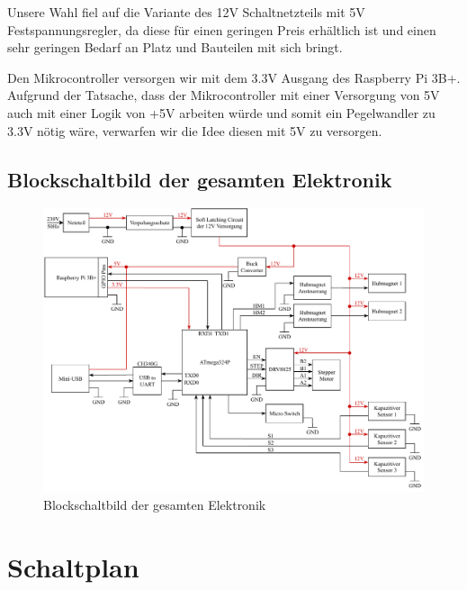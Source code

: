 Unsere Wahl fiel auf die Variante des 12V Schaltnetzteils mit 5V Festspannungsregler, da diese für einen geringen Preis erhältlich ist
und einen sehr geringen Bedarf an Platz und Bauteilen mit sich bringt.

Den Mikrocontroller versorgen wir mit dem 3.3V Ausgang des Raspberry Pi 3B+.
Aufgrund der Tatsache, dass der Mikrocontroller mit einer Versorgung von 5V auch mit einer Logik von +5V arbeiten würde und somit ein Pegelwandler zu 3.3V nötig wäre,
verwarfen wir die Idee diesen mit 5V zu versorgen.

\newpage

\subsection{Blockschaltbild der gesamten Elektronik}

\begin{figure}[hb]
    \centering
    \includegraphics[scale=0.85,page=1]{fig/elektro/ElectroBlockDiagram.pdf}
    \caption{Blockschaltbild der gesamten Elektronik}
\end{figure}

\newpage


\section{Schaltplan}

